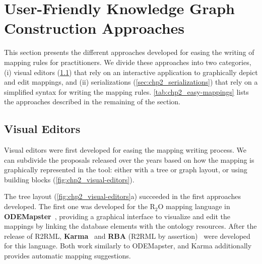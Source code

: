 \section{User-Friendly Knowledge Graph Construction Approaches}
\label{sec:chp2_easy_kgc}
 
This section presents the different approaches developed for easing the writing of mapping rules for practitioners. 
We divide these approaches into two categories, (i) visual editors (\cref{sec:chp2_visual-editors}) that rely on an interactive application to graphically depict and edit mappings, and (ii) serializations (\cref{sec:chp2_serializations}) that rely on a simplified syntax for writing the mapping rules. 
\cref{tab:chp2_easy-mappings} lists the approaches described in the remaining of the section.



\subsection{Visual Editors}
\label{sec:chp2_visual-editors}

Visual editors were first developed for easing the mapping writing process. We can subdivide the proposals released over the years based on how the mapping is graphically represented in the tool: either with a tree or graph layout, or using building blocks (\cref{fig:chp2_visual-editors}).


The tree layout (\cref{fig:chp2_visual-editors}a) succeeded in the first approaches developed. 
The first one was developed for the R$_2$O mapping language in \textbf{ODEMapster}~\parencite{barrasa2006odemapster}, providing a graphical interface to visualize and edit the mappings by linking the database elements with the ontology resources. 
After the release of R2RML, \textbf{Karma}~\parencite{gupta2012karma} and \textbf{RBA} (R2RML by assertion)~\parencite{neto2013rba} were developed for this language. Both work similarly to ODEMapster, and Karma additionally provides automatic mapping suggestions. 

